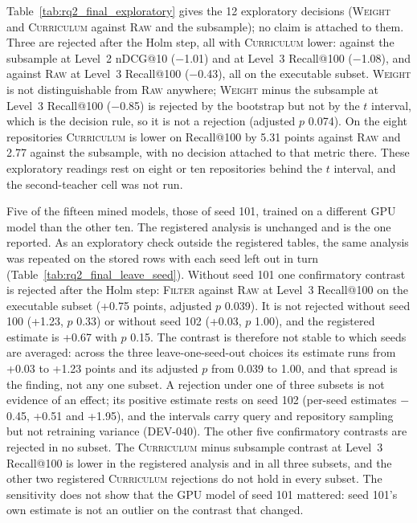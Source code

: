 \documentclass[10pt,twocolumn]{article}
\makeatletter
\renewcommand\paragraph{\@startsection{paragraph}{4}{\z@}{3pt}{-0.5em}{\normalfont\bfseries}}
\makeatother
\begin{document}
Table~\ref{tab:rq2_final_exploratory} gives the 12 exploratory decisions (\textsc{Weight} and \textsc{Curriculum} against \textsc{Raw} and the subsample); no claim is attached to them. Three are rejected after the Holm step, all with \textsc{Curriculum} lower: against the subsample at Level~2 nDCG@10 ($-$1.01) and at Level~3 Recall@100 ($-$1.08), and against \textsc{Raw} at Level~3 Recall@100 ($-$0.43), all on the executable subset. %
\textsc{Weight} is not distinguishable from \textsc{Raw} anywhere; \textsc{Weight} minus the subsample at Level~3 Recall@100 ($-$0.85) is rejected by the bootstrap but not by the $t$ interval, which is the decision rule, so it is not a rejection (adjusted $p$ 0.074). %
On the eight repositories \textsc{Curriculum} is lower on Recall@100 by 5.31 points against \textsc{Raw} and 2.77 against the subsample, with no decision attached to that metric there. %
These exploratory readings rest on eight or ten repositories behind the $t$ interval, and the second-teacher cell was not run.



\paragraph{Sensitivity to the seed average (exploratory).} Five of the fifteen mined models, those of seed 101, trained on a different GPU model than the other ten. The registered analysis is unchanged and is the one reported. As an exploratory check outside the registered tables, the same analysis was repeated on the stored rows with each seed left out in turn (Table~\ref{tab:rq2_final_leave_seed}).
Without seed 101 one confirmatory contrast is rejected after the Holm step: \textsc{Filter} against \textsc{Raw} at Level~3 Recall@100 on the executable subset (+0.75 points, adjusted $p$ 0.039). It is not rejected without seed 100 (+1.23, $p$ 0.33) or without seed 102 (+0.03, $p$ 1.00), and the registered estimate is +0.67 with $p$ 0.15. %
The contrast is therefore not stable to which seeds are averaged: across the three leave-one-seed-out choices its estimate runs from +0.03 to +1.23 points and its adjusted $p$ from 0.039 to 1.00, and that spread is the finding, not any one subset. A rejection under one of three subsets is not evidence of an effect; its positive estimate rests on seed 102 (per-seed estimates $-$0.45, +0.51 and +1.95), and the intervals carry query and repository sampling but not retraining variance (DEV-040). The other five confirmatory contrasts are rejected in no subset. %
The \textsc{Curriculum} minus subsample contrast at Level~3 Recall@100 is lower in the registered analysis and in all three subsets, and the other two registered \textsc{Curriculum} rejections do not hold in every subset. The sensitivity does not show that the GPU model of seed 101 mattered: seed 101's own estimate is not an outlier on the contrast that changed. %
\end{document}
